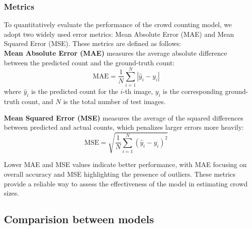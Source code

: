 \subsubsection{Metrics}
To quantitatively evaluate the performance of the crowd counting model, we adopt two widely used error metrics: Mean Absolute Error (MAE) and Mean Squared Error (MSE). These metrics are defined as follows:\\
\textbf{Mean Absolute Error (MAE)} measures the average absolute difference between the predicted count and the ground-truth count:
    \[
    \text{MAE} = \frac{1}{N} \sum_{i=1}^{N} | \hat{y}_i - y_i |
    \]
    where \( \hat{y}_i \) is the predicted count for the \(i\)-th image, \( y_i \) is the corresponding ground-truth count, and \( N \) is the total number of test images.

\textbf{Mean Squared Error (MSE)} measures the average of the squared differences between predicted and actual counts, which penalizes larger errors more heavily:
    \[
    \text{MSE} = \sqrt{ \frac{1}{N} \sum_{i=1}^{N} ( \hat{y}_i - y_i )^2 }
    \]

Lower MAE and MSE values indicate better performance, with MAE focusing on overall accuracy and MSE highlighting the presence of outliers. These metrics provide a reliable way to assess the effectiveness of the model in estimating crowd sizes.
\subsection{Comparision between models}

